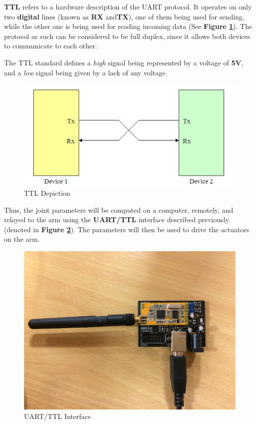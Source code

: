 \documentclass[12p,a4paper]{report}
\begin{document}
\textbf{TTL} refers to a hardware description of the UART protocol. It operates on only two \textbf{digital} lines (known as \textbf{RX} and\textbf{TX}), one of them being used for sending, while the other one is being used for reading incoming data (See \textbf{Figure \ref{fig:uart}}). The protocol as such can be considered to be full duplex, since it allows both devices to communicate to each other. 

The TTL standard defines a \emph{high} signal being represented by a voltage of \textbf{5V}, and a \emph{low} signal being given by a lack of any voltage.

\begin{figure}[H]
\begin{center}
\includegraphics[scale=0.40]{uart}
\caption{TTL Depiction \cite{uart}}
\label{fig:uart}
\end{center}
\end{figure}
\newpage
Thus, the joint parameters will be computed on a computer, remotely, and relayed to the arm using the \textbf{UART/TTL} interface described previously (denoted in \textbf{Figure \ref{fig:ttlinterface}}). The parameters will then be used to drive the actuators on the arm.

\begin{figure}[H]
\begin{center}
\includegraphics[scale=0.50]{ttlinterface_low}
\caption{UART/TTL Interface}
\label{fig:ttlinterface}
\end{center}
\end{figure}
\end{document}
